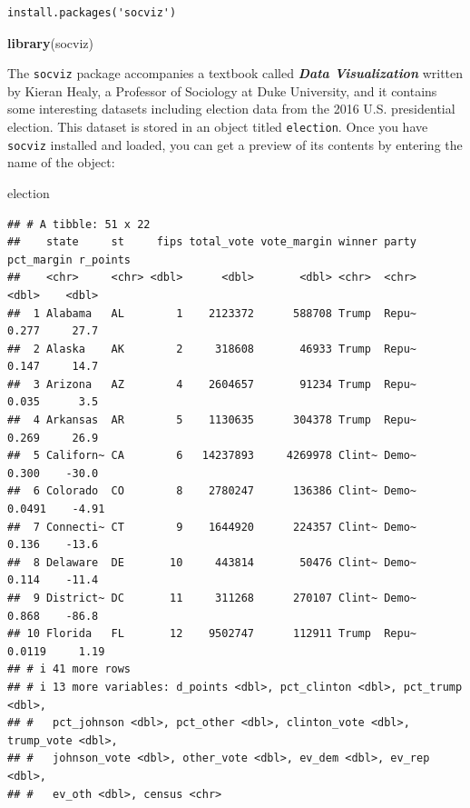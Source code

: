 \documentclass[
]{book}
\newenvironment{Shaded}{\begin{snugshade}}{\end{snugshade}}
\newcommand{\FunctionTok}[1]{\textcolor[rgb]{0.13,0.29,0.53}{\textbf{#1}}}
\newcommand{\NormalTok}[1]{#1}
\begin{document}
\begin{verbatim}
install.packages('socviz')
\end{verbatim}

\begin{Shaded}
\begin{Highlighting}[]
\FunctionTok{library}\NormalTok{(socviz)}
\end{Highlighting}
\end{Shaded}

The \texttt{socviz} package accompanies a textbook called \textbf{\emph{Data Visualization}} written by Kieran Healy, a Professor of Sociology at Duke University, and it contains some interesting datasets including election data from the 2016 U.S. presidential election. This dataset is stored in an object titled \texttt{election}. Once you have \texttt{socviz} installed and loaded, you can get a preview of its contents by entering the name of the object:

\begin{Shaded}
\begin{Highlighting}[]
\NormalTok{election}
\end{Highlighting}
\end{Shaded}

\begin{verbatim}
## # A tibble: 51 x 22
##    state     st     fips total_vote vote_margin winner party pct_margin r_points
##    <chr>     <chr> <dbl>      <dbl>       <dbl> <chr>  <chr>      <dbl>    <dbl>
##  1 Alabama   AL        1    2123372      588708 Trump  Repu~     0.277     27.7 
##  2 Alaska    AK        2     318608       46933 Trump  Repu~     0.147     14.7 
##  3 Arizona   AZ        4    2604657       91234 Trump  Repu~     0.035      3.5 
##  4 Arkansas  AR        5    1130635      304378 Trump  Repu~     0.269     26.9 
##  5 Californ~ CA        6   14237893     4269978 Clint~ Demo~     0.300    -30.0 
##  6 Colorado  CO        8    2780247      136386 Clint~ Demo~     0.0491    -4.91
##  7 Connecti~ CT        9    1644920      224357 Clint~ Demo~     0.136    -13.6 
##  8 Delaware  DE       10     443814       50476 Clint~ Demo~     0.114    -11.4 
##  9 District~ DC       11     311268      270107 Clint~ Demo~     0.868    -86.8 
## 10 Florida   FL       12    9502747      112911 Trump  Repu~     0.0119     1.19
## # i 41 more rows
## # i 13 more variables: d_points <dbl>, pct_clinton <dbl>, pct_trump <dbl>,
## #   pct_johnson <dbl>, pct_other <dbl>, clinton_vote <dbl>, trump_vote <dbl>,
## #   johnson_vote <dbl>, other_vote <dbl>, ev_dem <dbl>, ev_rep <dbl>,
## #   ev_oth <dbl>, census <chr>
\end{verbatim}
\end{document}

